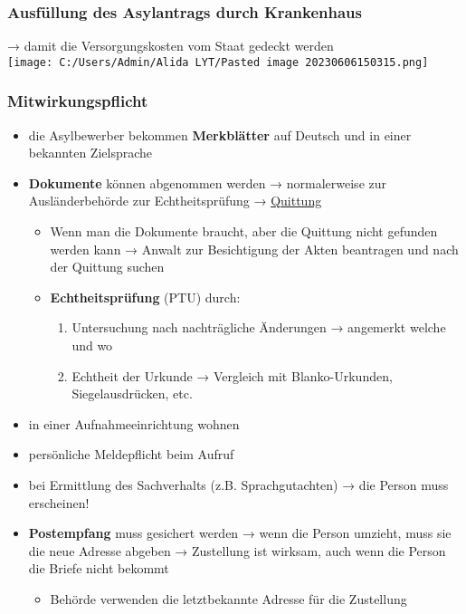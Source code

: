 \documentclass[
]{article}
\providecommand{\tightlist}{%
  \setlength{\itemsep}{0pt}\setlength{\parskip}{0pt}}
\begin{document}
\hypertarget{ausfuxfcllung-des-asylantrags-durch-krankenhaus}{%
\subsubsection{Ausfüllung des Asylantrags durch
Krankenhaus}\label{ausfuxfcllung-des-asylantrags-durch-krankenhaus}}

→ damit die Versorgungskosten vom Staat gedeckt werden\\
\texttt{[image: C:/Users/Admin/Alida LYT/Pasted image 20230606150315.png]}

\hypertarget{mitwirkungspflicht}{%
\subsubsection{Mitwirkungspflicht}\label{mitwirkungspflicht}}

\begin{itemize}
\tightlist
\item
  die Asylbewerber bekommen \textbf{Merkblätter} auf Deutsch und in
  einer bekannten Zielsprache
\item
  \textbf{Dokumente} können abgenommen werden → normalerweise zur
  Ausländerbehörde zur Echtheitsprüfung → \ul{Quittung}

  \begin{itemize}
  \tightlist
  \item
    Wenn man die Dokumente braucht, aber die Quittung nicht gefunden
    werden kann → Anwalt zur Besichtigung der Akten beantragen und nach
    der Quittung suchen
  \item
    \textbf{Echtheitsprüfung} (PTU) durch:

    \begin{enumerate}
    \tightlist
    \item
      Untersuchung nach nachträgliche Änderungen → angemerkt welche und
      wo
    \item
      Echtheit der Urkunde → Vergleich mit Blanko-Urkunden,
      Siegelausdrücken, etc.
    \end{enumerate}
  \end{itemize}
\item
  in einer Aufnahmeeinrichtung wohnen
\item
  persönliche Meldepflicht beim Aufruf
\item
  bei Ermittlung des Sachverhalts (z.B. Sprachgutachten) → die Person
  muss erscheinen!
\item
  \textbf{Postempfang} muss gesichert werden → wenn die Person umzieht,
  muss sie die neue Adresse abgeben → Zustellung ist wirksam, auch wenn
  die Person die Briefe nicht bekommt

  \begin{itemize}
  \tightlist
  \item
    Behörde verwenden die letztbekannte Adresse für die Zustellung
  \end{itemize}
\end{itemize}
\end{document}
